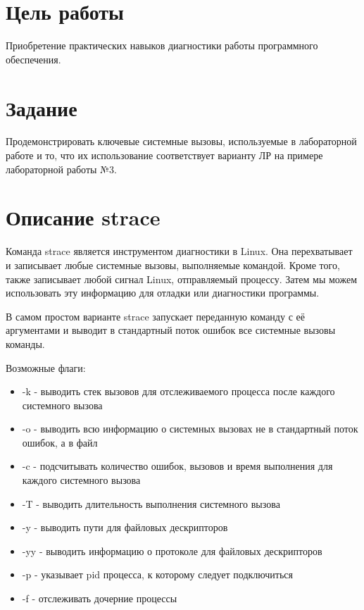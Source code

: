 \documentclass[a4paper, 12pt]{article}
\begin{document}
\section{Цель работы}
Приобретение практических навыков диагностики работы программного обеспечения.

\section{Задание}
Продемонстрировать ключевые 
системные вызовы, используемые в лабораторной работе и то, что их использование соответствует варианту ЛР на примере лабораторной работы №3.

\section{Описание strace}
 Команда strace является инструментом диагностики в Linux. Она перехватывает и записывает любые системные вызовы, выполняемые командой. Кроме того, также записывает любой сигнал Linux, отправляемый процессу. Затем мы можем использовать эту информацию для отладки или диагностики программы.

В самом простом варианте strace запускает переданную команду с её аргументами и выводит в стандартный поток ошибок все системные вызовы команды.

Возможные флаги:
\begin{itemize}
    \item -k - выводить стек вызовов для отслеживаемого процесса после каждого системного вызова
    \item -o - выводить всю информацию о системных вызовах не в стандартный поток ошибок, а в файл
    \item -c - подсчитывать количество ошибок, вызовов и время выполнения для каждого системного вызова
    \item -T - выводить длительность выполнения системного вызова
    \item -y - выводить пути для файловых дескрипторов
    \item -yy - выводить информацию о протоколе для файловых дескрипторов
    \item -p - указывает pid процесса, к которому следует подключиться
    \item -f - отслеживать дочерние процессы
\end {itemize}


\newpage
\end{document}
